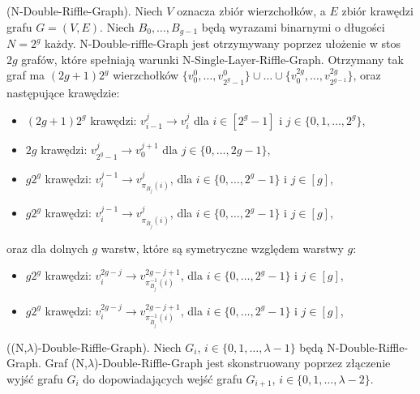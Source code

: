 \begin{definition}
	(N-Double-Riffle-Graph). Niech $V$ oznacza zbiór wierzchołków, a $E$ zbiór krawędzi grafu $G =(V, E)$. Niech $B_{0},\dots,B_{g-1}$ będą wyrazami binarnymi o długości $N = 2^{g}$ każdy.
	N-Double-riffle-Graph jest otrzymywany poprzez ułożenie w stos $2g$ grafów, które spełniają warunki N-Single-Layer-Riffle-Graph. Otrzymany tak graf ma $(2g+1)2^{g}$ wierzchołków $ \{ v_{0}^{0}, \dots , v_{2^{g} - 1}^{0} \} \cup \dots \cup \{ v_{0}^{2g},\dots,v_{2^{g - 1}}^{2g} \} $,
	oraz następujące krawędzie:
	\begin{itemize}
		\item $(2g + 1)2^{g}$ krawędzi: $v_{i-1}^{j} \rightarrow v_{i}^{j}$ dla $i \in [2^{g}-1]$ i $j \in \{0,1,\dots,2^{g} \}$,
		
		\item $2g$ krawędzi: $v_{2^{g} - 1}^{j} \rightarrow v_{0}^{j+1}$ dla $j \in \{0,\dots,2g-1 \} $,
		
		\item $g2^{g}$ krawędzi: $v_{i}^{j-1} \rightarrow v_{\pi_{B_{j}}(i)}^{j}$, dla $i \in \{0,\dots,2^{g} -1\}$ i $j \in [g]$,
		
		\item $g2^{g}$ krawędzi: $v_{i}^{j-1} \rightarrow v_{\pi_{\overline{B}_{j}}(i)}^{j}$, dla $i \in \{0,\dots,2^{g} -1\}$ i $j \in [g]$,
	\end{itemize}
	oraz dla dolnych $g$ warstw, które są symetryczne względem warstwy $g$:
	\begin{itemize}
		\item $g2^{g}$ krawędzi: $v_{i}^{2g - j} \rightarrow v_{\pi_{B_{j}}^{-1}(i)}^{2g -j + 1}$, dla $i \in \{0,\dots,2^{g} -1\}$ i $j \in [g]$,

		\item $g2^{g}$ krawędzi: $v_{i}^{2g - j} \rightarrow v_{\pi_{\overline{B}_{j}}^{-1}(i)}^{2g - j + 1}$, dla $i \in \{0,\dots,2^{g} -1\}$ i $j \in [g]$,
	\end{itemize}

\end{definition}


\begin{definition}
	((N,$\lambda$)-Double-Riffle-Graph). Niech $G_{i}$, $i \in \{ 0,1,\dots,\lambda - 1\}$ będą N-Double-Riffle-Graph. Graf (N,$\lambda$)-Double-Riffle-Graph jest skonstruowany poprzez złączenie wyjść grafu $G_{i}$ do dopowiadających wejść grafu $G_{i+1}$, $i \in \{ 0, 1, \dots, \lambda - 2\}$.
\end{definition}

